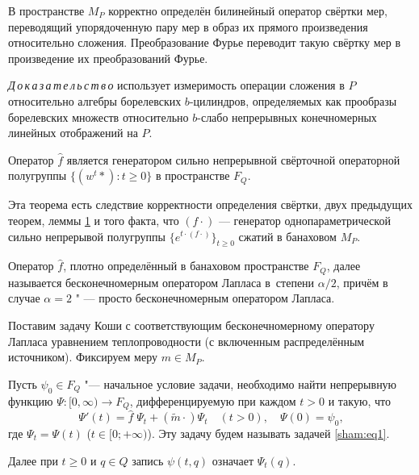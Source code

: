 \smallskip

\hypertarget{sham:lemma:1}{}
 \begin{lemma}[1]
   В пространстве $M_P$
  корректно определён
  билинейный оператор свёртки мер,
  переводящий упорядоченную пару мер
  в образ
  их прямого произведения
  относительно сложения.
  Преобразование Фурье переводит такую свёртку мер
  в произведение их преобразований Фурье.
 \end{lemma}

\smallskip
{\it   Д\,о\,к\,а\,з\,а\,т\,е\,л\,ь\,с\,т\,в\,о} использует измеримость операции сложения
  в $P$ относительно алгебры борелевских $b$-цилиндров,
  определяемых как прообразы борелевских множеств %
  относительно $b$-слабо непрерывных
  конечномерных линейных отображений на $P$.

\smallskip
 \begin{theorem}[3]
  Оператор $  \widehat{f } $
 является генератором
 сильно непрерывной
 свёрточной операторной  полугруппы $\{(w^t*): t\geqslant 0\}$
 в пространстве $F_Q.$
 \end{theorem}
 
 \smallskip


 Эта теорема есть следствие
 корректности определения свёртки,
 двух пре\-д\-ыдущих теорем, леммы \hyperlink{sham:lemma:1}{1} и того факта, что
 $(f\cdot)$ --- генератор
 однопараметрической
 сильно непрерывой полугруппы
 $\{e^{t\cdot(f\cdot)}\}_{t\geqslant 0}$
 сжатий
 в банаховом %
 $M_P$.
 

 \begin{definition}
 Оператор
 $
 \widehat{f} %
 $,
 плотно определённый  в банаховом пространстве $F_Q$,
  далее называется  бесконечномерным оператором Лапласа  в~степени $\alpha/2$,
 причём в случае $\alpha=2$ " --- просто  бесконечномерным оператором Лапласа.
 \end{definition}

\smallskip



 Поставим задачу Коши
  с соответствующим
  бесконечномерному оператору Лапласа
 уравнением теплопроводности
 (с включенным распределённым источником).
 Фиксируем меру $m\in M_P$.
 
 \smallskip

 \begin{definition}
 Пусть   $\psi_0\in F_Q$ "--- начальное условие задачи, необходимо  найти  непрерывную  функцию
 $\Psi:[0,\infty)\to F_Q$,
  дифференцируемую  при каждом $t>0$  и такую,  что
\begin{equation}
\label{sham:eq1}
 \Psi'(t)=\widehat {f }\; \Psi_t+ (\widetilde{m }\cdot) \Psi_t
 \quad (t>0), \quad \Psi(0)=\psi_0,
\end{equation}
где $\Psi_t=\Psi(t)$ ($t\in[0; +\infty)$).
 Эту задачу будем называть задачей \eqref{sham:eq1}.

 Далее при $t\geqslant 0$ и $q\in Q$  запись $\psi(t,q)$ означает
  $  \Psi_t(q) $.
 \end{definition}

